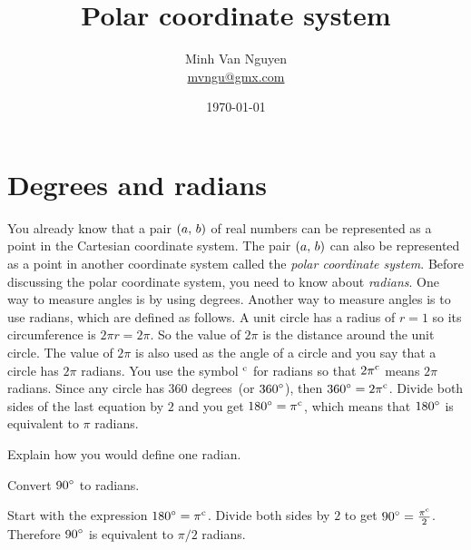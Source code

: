 \documentclass[a4paper,oneside,12pt]{article}
\begin{document}
\title{\Large\bf Polar coordinate system}
\author{%
  Minh Van Nguyen \\
  \url{mvngu@gmx.com}
}
\date{\today}
\maketitle



\section{Degrees and radians}

You already know that a pair $\tuple{a}{b}$ of real numbers can be
represented as a point in the Cartesian coordinate system.  The pair
$\tuple{a}{b}$ can also be represented as a point in another
coordinate system called the \emph{polar coordinate system}.  Before
discussing the polar coordinate system, you need to know about
\emph{radians}.  One way to measure angles is by using degrees.
Another way to measure angles is to use radians, which are defined as
follows.  A unit circle has a radius of $r = 1$ so its circumference
is $2 \pi r = 2 \pi$.  So the value of $2 \pi$ is the distance around
the unit circle.  The value of $2\pi$ is also used as the angle of a
circle and you say that a circle has $2\pi$ radians.  You use the
symbol $\radian{}$ for radians so that $\radian{2\pi}$ means $2\pi$
radians.  Since any circle has $360$ degrees~(or $\degree{360}$), then
$\degree{360} = \radian{2\pi}$.  Divide both sides of the last
equation by $2$ and you get $\degree{180} = \radian{\pi}$, which means
that $\degree{180}$ is equivalent to $\pi$ radians.

\begin{exercise}
Explain how you would define one radian.
\end{exercise}


\begin{example}
Convert $\degree{90}$ to radians.
\end{example}

\begin{solution}
Start with the expression $\degree{180} = \radian{\pi}$.  Divide both
sides by $2$ to get $\degree{90} = \frac{\radian{\pi}}{2}$.  Therefore
$\degree{90}$ is equivalent to $\pi / 2$ radians.
\end{solution}
\end{document}

